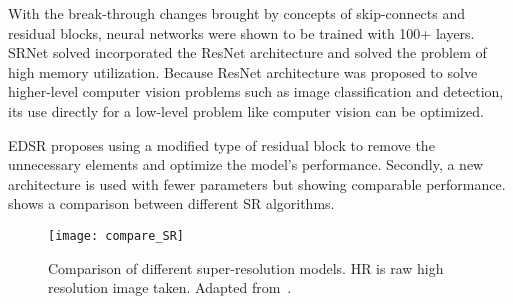 With the break-through changes brought by concepts of skip-connects and residual blocks, neural networks were shown to be trained with 100+ layers. SRNet solved incorporated the ResNet architecture and solved the problem of high memory utilization. Because ResNet architecture was proposed to solve higher-level computer vision problems such as image classification and detection, its use directly for a low-level problem like computer vision can be optimized.

EDSR proposes using a modified type of residual block to remove the unnecessary elements and optimize the model's performance. Secondly, a new architecture is used with fewer parameters but showing comparable performance.  shows a comparison between different SR algorithms.

\begin{figure}[h!]
  \centering
  \texttt{[image: compare\_SR]}
  \caption[Comparison of different super-resolution models]{Comparison of different super-resolution models. HR is raw high resolution image taken. Adapted from~\cite{EDSR}.}
  \label{fig:compare_SR}
\end{figure}
